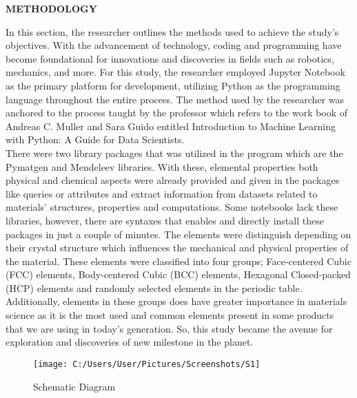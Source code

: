 \documentclass[12pt]{article}
\begin{document}
\newpage
\begin{center}
\textbf{METHODOLOGY}
\end{center}

In this section, the researcher outlines the methods used to achieve the study's objectives. With the advancement of technology, coding and programming have become foundational for innovations and discoveries in fields such as robotics, mechanics, and more. For this study, the researcher employed Jupyter Notebook as the primary platform for development, utilizing Python as the programming language throughout the entire process. The method used by the researcher was anchored to the process taught by the professor which refers to the work book of Andreas C. Muller and Sara Guido entitled Introduction to Machine Learning with Python: A Guide for Data Scientists.\\
\indent There were two library packages that was utilized in the program which are the Pymatgen and Mendeleev libraries. With these, elemental properties both physical and chemical aspects were already provided and given in the packages like queries or attributes and extract information from datasets related to materials’ structures, properties and computations. Some notebooks lack these libraries, however, there are syntaxes that enables and directly install these packages in just a couple of minutes. The elements were distinguish depending on their crystal structure which influences the mechanical and physical properties of the material. These elements were classified into four groups; Face-centered Cubic (FCC) elements, Body-centered Cubic (BCC) elements, Hexagonal Closed-packed (HCP) elements and randomly selected elements in the periodic table. Additionally, elements in these groups does have greater importance in materials science as it is the most used and common elements present in some products that we are using in today’s generation. So, this study became the avenue for exploration and discoveries of new milestone in the planet.\\
\begin{figure}[h!]
	\centering
	\texttt{[image: C:/Users/User/Pictures/Screenshots/S1]}
	\caption{Schematic Diagram}
\end{figure}
\newpage
\end{document}
